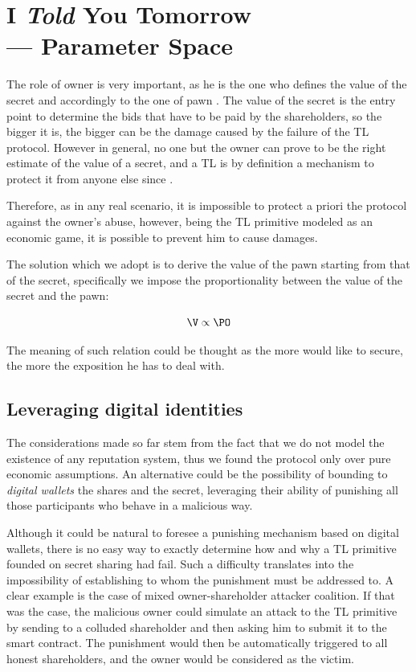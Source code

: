 \chapter[IYTY --- Parameter Space]{I {\em Told} You Tomorrow\\--- Parameter Space}\label{sect:discussion} 

The role of owner is very important, as he is the one who defines the value \V of the secret  and accordingly to the one of pawn \PO. The value of the secret is the entry point to determine the bids that have to be paid by the shareholders, so the bigger it is, the bigger can be the damage caused by the failure of the TL protocol.
However in general, no one but the owner can prove \V to be the right estimate of the value of a secret, and a TL is by definition a mechanism to protect it from anyone else since \td. 

Therefore, as in any real scenario, it is impossible to protect a priori the protocol against the owner's abuse, however, being the TL primitive modeled as an economic game, it is possible to prevent him to cause damages. 

The solution which we adopt is to derive the value of the pawn starting from that of the secret, specifically we impose the proportionality between the value of the secret and the pawn:

\begin{equation}\label{proprel1}
\V \propto \PO
\end{equation}

The meaning of such relation could be thought as the more \owner would like to secure, the more the exposition he has to deal with.

\section{Leveraging digital identities}
The considerations made so far stem from the fact that we do not model the existence of any reputation system, thus we found the protocol only over pure economic assumptions. An alternative could be the possibility of bounding to {\em digital wallets} the shares and the secret, leveraging their ability of punishing all those participants who behave in a malicious way.

Although it could be natural to foresee a punishing mechanism based on digital wallets, there is no easy way to exactly determine how and why a TL primitive founded on secret sharing had fail. Such a difficulty translates into the impossibility of establishing to whom the punishment must be addressed to. A clear example is the case of mixed owner-shareholder attacker coalition. If that was the case, the malicious owner could simulate an attack to the TL primitive by sending \secret to a colluded shareholder and then asking him to submit it to the smart contract. The punishment would then be automatically triggered to all honest shareholders, and the owner would be considered as the victim.

